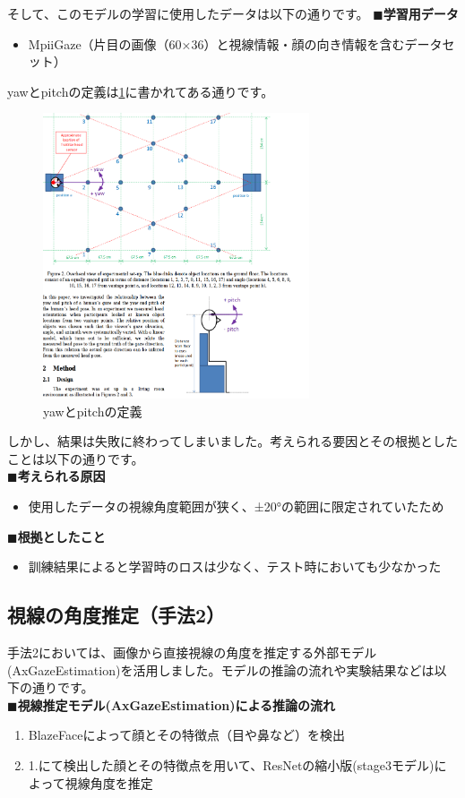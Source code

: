 そして、このモデルの学習に使用したデータは以下の通りです。
$\blacksquare$\textbf{学習用データ}
\begin{itemize}
    \item MpiiGaze（片目の画像（60×36）と視線情報・顔の向き情報を含むデータセット）
\end{itemize}
yawとpitchの定義は\ref{fig:yaw_pitch_measurement}に書かれてある通りです。\\
\begin{figure}[!ht]
    \centering
    \includegraphics[width=0.7\textwidth]{eye-track-cursor/fig/gaze_definition.png}
    \caption{yawとpitchの定義}
    \label{fig:yaw_pitch_measurement}
\end{figure}
しかし、結果は失敗に終わってしまいました。考えられる要因とその根拠としたことは以下の通りです。\\
$\blacksquare$\textbf{考えられる原因}
\begin{itemize}
    \item 使用したデータの視線角度範囲が狭く、±20°の範囲に限定されていたため
\end{itemize}
$\blacksquare$\textbf{根拠としたこと}
\begin{itemize}
    \item 訓練結果によると学習時のロスは少なく、テスト時においても少なかった
\end{itemize}
\subsection{視線の角度推定（手法2）}
手法2においては、画像から直接視線の角度を推定する外部モデル(AxGazeEstimation)を活用しました。モデルの推論の流れや実験結果などは以下の通りです。\\
$\blacksquare$\textbf{視線推定モデル(AxGazeEstimation)による推論の流れ}
\begin{enumerate}
    \item BlazeFace\cite{bazarevsky2019blazeface}によって顔とその特徴点（目や鼻など）を検出
    \item 1.にて検出した顔とその特徴点を用いて、ResNetの縮小版(stage3モデル)によって視線角度を推定
\end{enumerate}

